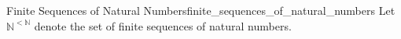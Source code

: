 \begin{definition}{Finite Sequences of Natural
Numbers}{finite_sequences_of_natural_numbers}
Let $\mathbb{N}^{<\mathbb{N}}$ denote the set of finite sequences of natural
numbers.
\end{definition}
